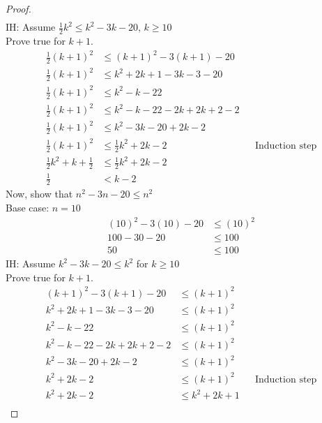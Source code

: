 \documentclass{article}
\begin{document}
\begin{enumerate}
\begin{proof}
\begin{align*}
                    \end{align*}
                    IH: Assume $\frac{1}{2}k^2 \leq k^2-3k-20$, $k\geq 10$\\
                    Prove true for $k+1$.
                    \begin{align*}
                        \frac{1}{2}(k+1)^2 &\leq (k+1)^2-3(k+1)-20\\
                        \frac{1}{2}(k+1)^2 &\leq k^2+2k+1-3k-3-20\\
                        \frac{1}{2}(k+1)^2 &\leq k^2-k-22 \\
                        \frac{1}{2}(k+1)^2 &\leq k^2-k-22-2k+2k+2-2 \\
                        \frac{1}{2}(k+1)^2 &\leq k^2-3k-20+2k-2 \\
                        \frac{1}{2}(k+1)^2 &\leq \frac{1}{2}k^2+2k-2 &&\text{Induction step}\\
                        \frac{1}{2}k^2 + k +\frac{1}{2} &\leq \frac{1}{2}k^2+2k-2 \\ 
                        \frac{1}{2} &< k-2
                    \end{align*}
                    Now, show that $n^2-3n-20\leq n^2$\\
                    Base case: $n=10$
                    \begin{align*}
                        (10)^2-3(10)-20 &\leq (10)^2 \\
                        100-30-20 &\leq 100\\
                        50 &\leq 100
                    \end{align*}
                    IH: Assume $k^2-3k-20\leq k^2$ for $k\geq 10$\\
                    Prove true for $k+1$.
                    \begin{align*}
                        (k+1)^2-3(k+1)-20 &\leq (k+1)^2 \\
                        k^2+2k+1-3k-3-20 &\leq (k+1)^2 \\
                        k^2-k-22 &\leq (k+1)^2 \\
                        k^2-k-22-2k+2k+2-2 &\leq (k+1)^2 \\
                        k^2-3k-20+2k-2 &\leq (k+1)^2 \\
                        k^2+2k-2 &\leq (k+1)^2 &&\text{Induction step}\\
                        k^2+2k-2 &\leq k^2+2k+1 \\

\end{align*}
\end{proof}
\end{enumerate}
\end{document}
